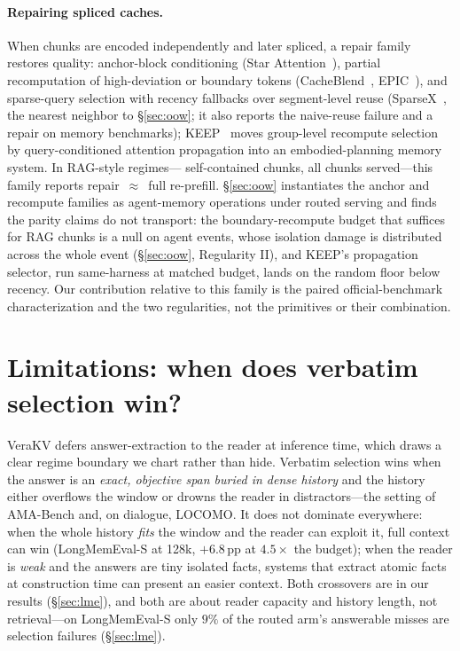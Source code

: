 \documentclass{article} %
\newcommand{\pp}{\,\mathrm{pp}}
\newcommand{\kvm}{VeraKV}
\begin{document}
\paragraph{Repairing spliced caches.}
When chunks are encoded independently and later spliced, a repair family restores
quality: anchor-block conditioning (Star Attention~\citep{star}), partial recomputation
of high-deviation or boundary tokens (CacheBlend~\citep{cacheblend}, EPIC~\citep{epic}),
and sparse-query selection with recency fallbacks over segment-level reuse
(SparseX~\citep{sparsex}, the nearest neighbor to \S\ref{sec:oow}; it also reports the
naive-reuse failure and a repair on memory benchmarks); KEEP~\citep{keep} moves
group-level recompute selection by query-conditioned attention propagation into an
embodied-planning memory system. In RAG-style regimes---
self-contained chunks, all chunks served---this family reports repair~$\approx$~full
re-prefill. \S\ref{sec:oow} instantiates the anchor and recompute families as
agent-memory operations under routed serving and finds the parity claims do not
transport: the boundary-recompute budget that suffices for RAG chunks is a null on agent
events, whose isolation damage is distributed across the whole event
(\S\ref{sec:oow}, Regularity II), and KEEP's propagation selector, run same-harness at
matched budget, lands on the random floor below recency. Our contribution relative to this family is the paired
official-benchmark characterization and the two regularities, not the primitives or their
combination.

\section{Limitations: when does verbatim selection win?}
\label{sec:limits}

\kvm{} defers answer-extraction to the reader at inference time, which draws a
clear regime boundary we chart rather than hide. Verbatim selection wins when the
answer is an \emph{exact, objective span buried in dense history} and the history
either overflows the window or drowns the reader in distractors---the setting of
AMA-Bench and, on dialogue, LOCOMO. It does not dominate everywhere: when the
whole history \emph{fits} the window and the reader can exploit it, full context
can win (LongMemEval-S at 128k, $+6.8\pp$ at $4.5\times$ the budget); when the
reader is \emph{weak} and the answers are tiny isolated facts, systems that
extract atomic facts at construction time can present an easier context. Both
crossovers are in our results (\S\ref{sec:lme}), and both are about reader
capacity and history length, not retrieval---on LongMemEval-S only $9\%$ of the routed
arm's answerable misses are selection failures (\S\ref{sec:lme}).
\end{document}
